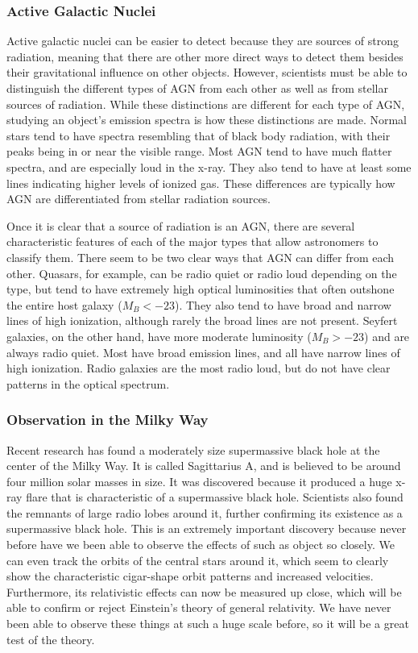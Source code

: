 \documentclass[12pt]{article}
\begin{document}
    \subsubsection{Active Galactic Nuclei}
    Active galactic nuclei can be easier to detect because they are sources of
    strong radiation, meaning that there are other more direct ways to detect
    them besides their gravitational influence on other objects.  However,
    scientists must be able to distinguish the different types of AGN from each
    other as well as from stellar sources of radiation.  While these
    distinctions are different for each type of AGN, studying an object's
    emission spectra is how these distinctions are made.  Normal stars tend to
    have spectra resembling that of black body radiation, with their peaks being
    in or near the visible range.  Most AGN tend to have much flatter spectra,
    and are especially loud in the x-ray.  They also tend to have at least some
    lines indicating higher levels of ionized gas.  These differences are
    typically how AGN are differentiated from stellar radiation sources.

    Once it is clear that a source of radiation is an AGN, there are several
    characteristic features of each of the major types that allow astronomers to
    classify them.  There seem to be two clear ways that AGN can differ from
    each other.  Quasars, for example, can be radio quiet or radio loud
    depending on the type, but tend to have extremely high optical luminosities
    that often outshone the entire host galaxy ($M_B < -23$).  They also tend to
    have broad and narrow lines of high ionization, although rarely the broad
    lines are not present.  Seyfert galaxies, on the other hand, have more
    moderate luminosity ($M_B > -23$) and are always radio quiet.  Most have
    broad emission lines, and all have narrow lines of high ionization.  Radio
    galaxies are the most radio loud, but do not have clear patterns in the
    optical spectrum.

    \subsubsection{Observation in the Milky Way}
    Recent research has found a moderately size supermassive black hole at the
    center of the Milky Way.  It is called Sagittarius A, and is believed to be
    around four million solar masses in size.  It was discovered because it
    produced a huge x-ray flare that is characteristic of a supermassive black
    hole.  Scientists also found the remnants of large radio lobes around it,
    further confirming its existence as a supermassive black hole.  This is an
    extremely important discovery because never before have we been able to
    observe the effects of such as object so closely.  We can even track the
    orbits of the central stars around it, which seem to clearly show the
    characteristic cigar-shape orbit patterns and increased velocities.
    Furthermore, its relativistic effects can now be measured up close, which
    will be able to confirm or reject Einstein's theory of general relativity.
    We have never been able to observe these things at such a huge scale before,
    so it will be a great test of the theory.
\end{document}

